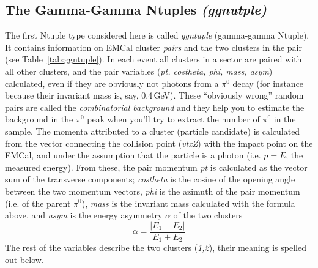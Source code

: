 \documentclass[pdftex,12pt,letter]{article}
\newcommand{\piz}{\mbox{$\pi^0$}\xspace}
\newcommand{\gev}{\mbox{GeV}\xspace}
\begin{document}
\subsection{The Gamma-Gamma Ntuples \it{(ggnutple)}}
The first Ntuple type considered here is called {\it ggntuple} (gamma-gamma Ntuple).
It contains information on EMCal cluster {\it pairs} and the two clusters
in the pair (see Table~\ref{tab:ggntuple}).  In each event all
clusters in a sector are paired with all other clusters, and the pair
variables ({\it pt, costheta, phi, mass, asym}) calculated, even if
they are obviously not photons from a \piz decay (for instance because
their invariant mass is, say, 0.4\,\gev).  These ``obviously wrong''
random pairs are called the {\it combinatorial background} and they
help you to estimate the background in the \piz peak when you'll try
to extract the number of \piz in the sample.
The momenta attributed to a cluster (particle candidate) is calculated
from the vector connecting the collision point ({\it vtxZ}) with the
impact point on the EMCal, and under the assumption that the particle
is a photon (i.e. $p=E$, the measured energy).  From these, the pair
momentum {\it pt} is calculated as the vector sum of the transverse
components; {\it costheta} is the cosine of the opening angle between
the two momentum vectors, {\it phi} is the azimuth of the pair
momentum (i.e. of the parent \piz), {\it mass} is the invariant mass
calculated with the formula above, and {\it asym} is the energy
asymmetry $\alpha$ of the two clusters
$$\alpha = \frac{|E_1-E_2|}{E_1+E_2}$$
The rest of the variables describe the two clusters ({\it 1,2}), their
meaning is spelled out below.
\end{document}
